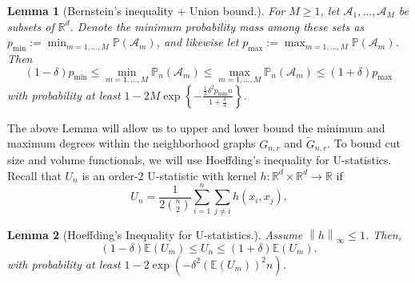 \documentclass[11pt,twoside]{article}
\newtheorem{lemma}{Lemma}
\theoremstyle{definition}
\newcommand{\Reals}{\mathbb{R}}
\newcommand{\Rd}{\Reals^d}
\newcommand{\norm}[1]{\left\lVert#1\right\rVert}
\newcommand{\1}{\mathbbm{1}}
\newcommand{\Pbb}{\mathbb{P}}
\begin{document}
\begin{lemma}[Bernstein's inequality + Union bound.]
	\label{lem:bernstein_union}
	For $M \geq 1$, let $\mathcal{A}_1,\ldots,\mathcal{A}_M$ be subsets of $\Reals^d$. Denote the minimum probability mass among these sets as $p_{\min} := \min_{m = 1,\ldots,M} \Pbb(\mathcal{A}_m)$, and likewise let $p_{\max} := \max_{m = 1,\ldots,M} \Pbb(\mathcal{A}_m)$. Then
	\begin{equation*}
	(1 - \delta)p_{\min} \leq \min_{m = 1,\ldots,M} \Pbb_n(\mathcal{A}_m) \leq \max_{m = 1,\ldots,M} \Pbb_n(\mathcal{A}_m) \leq (1 + \delta)p_{\max}
	\end{equation*}
	with probability at least $1 - 2 M \exp\left\{-\frac{\frac{1}{3}\delta^2p_{\min}n}{1 + \frac{\delta}{3}}\right\}$.  
\end{lemma}
The above Lemma will allow us to upper and lower bound the minimum and maximum degrees within the neighborhood graphs $G_{n,r}$ and $\widetilde{G}_{n,r}$. To bound cut size and volume functionals, we will use Hoeffding's inequality for U-statistics. Recall that $U_n$ is an order-2 U-statistic with kernel $h: \Rd \times \Rd \to \Reals$ if 
\begin{equation*}
U_n = \frac{1}{2{n \choose 2}}\sum_{i = 1}^{n} \sum_{j \neq i} h(x_i,x_j).
\end{equation*}
\begin{lemma}[Hoeffding's Inequality for U-statistics.]
	\label{lem:hoeffding}
	Assume $\norm{h}_{\infty} \leq 1$. Then,
	\begin{equation*}
	(1 - \delta) \mathbb{E}(U_m) \leq U_n \leq (1 + \delta) \mathbb{E}(U_m).
	\end{equation*}
	with probability at least $1 - 2 \exp\left(-\delta^2 (\mathbb{E}(U_m))^2 n\right)$.
\end{lemma}
\end{document}

